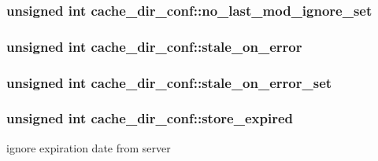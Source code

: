 \subsubsection[{\texorpdfstring{no\+\_\+last\+\_\+mod\+\_\+ignore\+\_\+set}{no_last_mod_ignore_set}}]{\setlength{\rightskip}{0pt plus 5cm}unsigned {\bf int} cache\+\_\+dir\+\_\+conf\+::no\+\_\+last\+\_\+mod\+\_\+ignore\+\_\+set}\hypertarget{structcache__dir__conf_abb45f257622fd489f886dfb751d6e0fe}{}\label{structcache__dir__conf_abb45f257622fd489f886dfb751d6e0fe}
\subsubsection[{\texorpdfstring{stale\+\_\+on\+\_\+error}{stale_on_error}}]{\setlength{\rightskip}{0pt plus 5cm}unsigned {\bf int} cache\+\_\+dir\+\_\+conf\+::stale\+\_\+on\+\_\+error}\hypertarget{structcache__dir__conf_a8fa201f55f9027f150b5a889464609c6}{}\label{structcache__dir__conf_a8fa201f55f9027f150b5a889464609c6}
\subsubsection[{\texorpdfstring{stale\+\_\+on\+\_\+error\+\_\+set}{stale_on_error_set}}]{\setlength{\rightskip}{0pt plus 5cm}unsigned {\bf int} cache\+\_\+dir\+\_\+conf\+::stale\+\_\+on\+\_\+error\+\_\+set}\hypertarget{structcache__dir__conf_a86fe83811a4b61200faf7dbb5fb6ef46}{}\label{structcache__dir__conf_a86fe83811a4b61200faf7dbb5fb6ef46}
\subsubsection[{\texorpdfstring{store\+\_\+expired}{store_expired}}]{\setlength{\rightskip}{0pt plus 5cm}unsigned {\bf int} cache\+\_\+dir\+\_\+conf\+::store\+\_\+expired}\hypertarget{structcache__dir__conf_a30192fcdd95d30467fb4b5e2016eeba8}{}\label{structcache__dir__conf_a30192fcdd95d30467fb4b5e2016eeba8}
ignore expiration date from server 
